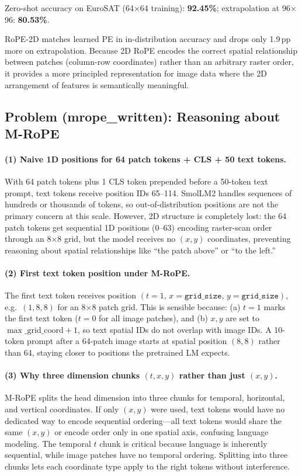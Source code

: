 \documentclass[11pt]{article}
\begin{document}
Zero-shot accuracy on EuroSAT (64$\times$64 training): \textbf{92.45\%}; extrapolation at 96$\times$96: \textbf{80.53\%}.

RoPE-2D matches learned PE in in-distribution accuracy and drops only 1.9\,pp more on extrapolation. Because 2D RoPE encodes the correct spatial relationship between patches (column-row coordinates) rather than an arbitrary raster order, it provides a more principled representation for image data where the 2D arrangement of features is semantically meaningful.

\subsection*{Problem (mrope\_written): Reasoning about M-RoPE}

\paragraph{(1) Naive 1D positions for 64 patch tokens + CLS + 50 text tokens.}
With 64 patch tokens plus 1 CLS token prepended before a 50-token text prompt, text tokens receive position IDs 65--114. SmolLM2 handles sequences of hundreds or thousands of tokens, so out-of-distribution positions are not the primary concern at this scale. However, 2D structure is completely lost: the 64 patch tokens get sequential 1D positions (0--63) encoding raster-scan order through an 8$\times$8 grid, but the model receives no $(x,y)$ coordinates, preventing reasoning about spatial relationships like ``the patch above'' or ``to the left.''

\paragraph{(2) First text token position under M-RoPE.}
The first text token receives position $(t{=}1,\, x{=}\texttt{grid\_size},\, y{=}\texttt{grid\_size})$, e.g.\ $(1,8,8)$ for an 8$\times$8 patch grid. This is sensible because: (a) $t{=}1$ marks the first text token ($t{=}0$ for all image patches), and (b) $x,y$ are set to $\max\_\mathrm{grid\_coord}+1$, so text spatial IDs do not overlap with image IDs. A 10-token prompt after a 64-patch image starts at spatial position $(8,8)$ rather than 64, staying closer to positions the pretrained LM expects.

\paragraph{(3) Why three dimension chunks $(t,x,y)$ rather than just $(x,y)$.}
M-RoPE splits the head dimension into three chunks for temporal, horizontal, and vertical coordinates. If only $(x,y)$ were used, text tokens would have no dedicated way to encode sequential ordering---all text tokens would share the same $(x,y)$ or encode order only in one spatial axis, confusing language modeling. The temporal $t$ chunk is critical because language is inherently sequential, while image patches have no temporal ordering. Splitting into three chunks lets each coordinate type apply to the right tokens without interference.
\end{document}
